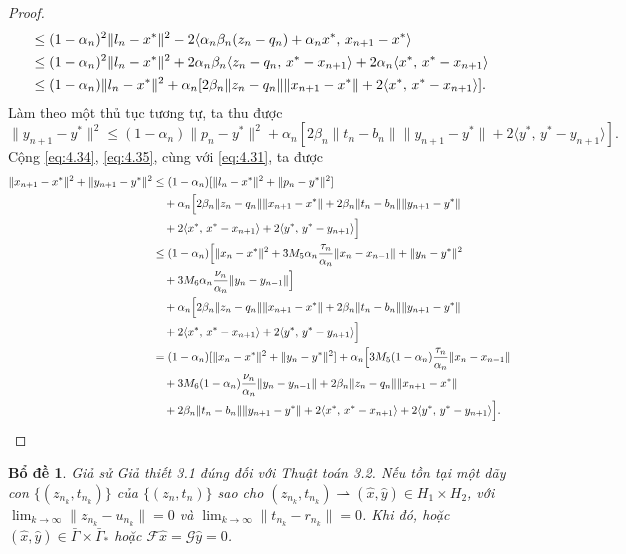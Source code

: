 \documentclass[11pt,a4paper]{article}
\theoremstyle{plain}
\newtheorem{lemma}[theorem]{Bổ đề}
\theoremstyle{definition}
\theoremstyle{remark}
\numberwithin{equation}{section}
\newcommand{\Fc}{\mathcal{F}}
\newcommand{\Gc}{\mathcal{G}}
\newcommand{\inp}[2]{\langle #1,\,#2\rangle}
\newcommand{\nm}[1]{\lVert #1\rVert}
\newcommand{\wto}{\rightharpoonup}
\newcommand{\Gam}{\bar{\Gamma}}
\newcommand{\Gams}{\bar{\Gamma}_{*}}
\begin{document}
\begin{proof}
\begin{align}
&\le (1-\alpha_n)^2\nm{l_n-x^{*}}^2-2\inp{\alpha_n\beta_n(z_n-q_n)+\alpha_n x^{*}}{x_{n+1}-x^{*}}\notag\\
&\le (1-\alpha_n)^2\nm{l_n-x^{*}}^2+2\alpha_n\beta_n\inp{z_n-q_n}{x^{*}-x_{n+1}}+2\alpha_n\inp{x^{*}}{x^{*}-x_{n+1}}\notag\\
&\le (1-\alpha_n)\nm{l_n-x^{*}}^2+\alpha_n[2\beta_n\nm{z_n-q_n}\nm{x_{n+1}-x^{*}}+2\inp{x^{*}}{x^{*}-x_{n+1}}]. \label{eq:4.34}
\end{align}
Làm theo một thủ tục tương tự, ta thu được
\begin{equation}
\nm{y_{n+1}-y^{*}}^2\le(1-\alpha_n)\nm{p_n-y^{*}}^2+\alpha_n[2\beta_n\nm{t_n-b_n}\nm{y_{n+1}-y^{*}}+2\inp{y^{*}}{y^{*}-y_{n+1}}]. \label{eq:4.35}
\end{equation}
Cộng \eqref{eq:4.34}, \eqref{eq:4.35}, cùng với \eqref{eq:4.31}, ta được
\begin{align*}
\nm{x_{n+1}-x^{*}}^2+\nm{y_{n+1}-y^{*}}^2 &\le (1-\alpha_n)[\nm{l_n-x^{*}}^2+\nm{p_n-y^{*}}^2]\\
&\quad +\alpha_n\Bigl[2\beta_n\nm{z_n-q_n}\nm{x_{n+1}-x^{*}}+2\beta_n\nm{t_n-b_n}\nm{y_{n+1}-y^{*}}\\
&\quad +2\inp{x^{*}}{x^{*}-x_{n+1}}+2\inp{y^{*}}{y^{*}-y_{n+1}}\Bigr]\\
&\le (1-\alpha_n)\Bigl[\nm{x_n-x^{*}}^2+3M_5\alpha_n\frac{\tau_n}{\alpha_n}\nm{x_n-x_{n-1}}+\nm{y_n-y^{*}}^2\\
&\quad +3M_6\alpha_n\frac{\nu_n}{\alpha_n}\nm{y_n-y_{n-1}}\Bigr]\\
&\quad +\alpha_n\Bigl[2\beta_n\nm{z_n-q_n}\nm{x_{n+1}-x^{*}}+2\beta_n\nm{t_n-b_n}\nm{y_{n+1}-y^{*}}\\
&\quad +2\inp{x^{*}}{x^{*}-x_{n+1}}+2\inp{y^{*}}{y^{*}-y_{n+1}}\Bigr]\\
&= (1-\alpha_n)[\nm{x_n-x^{*}}^2+\nm{y_n-y^{*}}^2]+\alpha_n\Bigl[3M_5(1-\alpha_n)\frac{\tau_n}{\alpha_n}\nm{x_n-x_{n-1}}\\
&\quad +3M_6(1-\alpha_n)\frac{\nu_n}{\alpha_n}\nm{y_n-y_{n-1}}+2\beta_n\nm{z_n-q_n}\nm{x_{n+1}-x^{*}}\\
&\quad +2\beta_n\nm{t_n-b_n}\nm{y_{n+1}-y^{*}}+2\inp{x^{*}}{x^{*}-x_{n+1}}+2\inp{y^{*}}{y^{*}-y_{n+1}}\Bigr].
\end{align*}
\end{proof}

\begin{lemma}\label{lem:4.7}
Giả sử Giả thiết 3.1 đúng đối với Thuật toán 3.2. Nếu tồn tại một dãy con $\{(z_{n_k},t_{n_k})\}$ của $\{(z_n,t_n)\}$ sao cho $(z_{n_k},t_{n_k})\wto(\hat{x},\hat{y})\in H_1\times H_2$, với $\lim_{k\to\infty}\nm{z_{n_k}-u_{n_k}}=0$ và $\lim_{k\to\infty}\nm{t_{n_k}-r_{n_k}}=0$. Khi đó, hoặc $(\hat{x},\hat{y})\in\Gam\times\Gams$ hoặc $\Fc\hat{x}=\Gc\hat{y}=0$.
\end{lemma}
\end{document}
